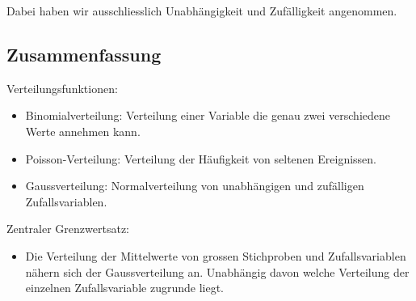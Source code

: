 Dabei haben wir ausschliesslich Unabh\"angigkeit und Zuf\"alligkeit angenommen.

\subsection{Zusammenfassung}
\label{subsec:vl5-6}

Verteilungsfunktionen:
\begin{itemize}
    \setlength\itemsep{0em}
        \item Binomialverteilung: Verteilung einer Variable die genau zwei verschiedene Werte annehmen kann.
        \item Poisson-Verteilung: Verteilung der H\"aufigkeit von seltenen Ereignissen.
        \item Gaussverteilung: Normalverteilung von unabh\"angigen und zuf\"alligen Zufallsvariablen.
\end{itemize}
Zentraler Grenzwertsatz:
\begin{itemize}
    \setlength\itemsep{0em}
        \item Die Verteilung der Mittelwerte von grossen Stichproben und Zufallsvariablen n\"ahern sich der Gaussverteilung an. Unabh\"angig davon welche Verteilung der einzelnen Zufallsvariable zugrunde liegt.
\end{itemize}